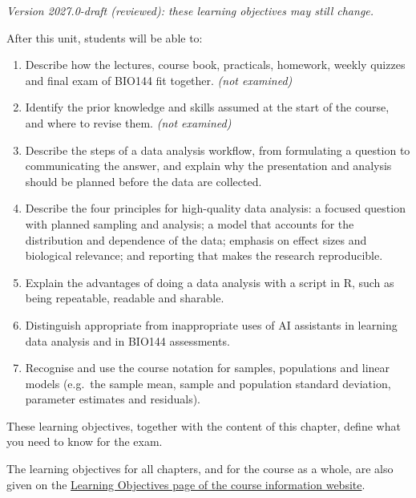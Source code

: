 \documentclass[
  letterpaper,
  8pt,
  a4paper]{book}
\providecommand{\tightlist}{%
  \setlength{\itemsep}{0pt}\setlength{\parskip}{0pt}}
\begin{document}
\begin{tcolorbox}[enhanced jigsaw, arc=.35mm, bottomrule=.15mm, bottomtitle=1mm, breakable, colback=white, colbacktitle=quarto-callout-note-color!10!white, colframe=quarto-callout-note-color-frame, coltitle=black, left=2mm, leftrule=.75mm, opacityback=0, opacitybacktitle=0.6, rightrule=.15mm, title=\textcolor{quarto-callout-note-color}{\faInfo}\hspace{0.5em}{Learning objectives}, titlerule=0mm, toprule=.15mm, toptitle=1mm]

\emph{Version 2027.0-draft (reviewed): these learning objectives may
still change.}

After this unit, students will be able to:

\begin{enumerate}
\def\labelenumi{\arabic{enumi}.}
\tightlist
\item
  Describe how the lectures, course book, practicals, homework, weekly
  quizzes and final exam of BIO144 fit together. \emph{(not examined)}
\item
  Identify the prior knowledge and skills assumed at the start of the
  course, and where to revise them. \emph{(not examined)}
\item
  Describe the steps of a data analysis workflow, from formulating a
  question to communicating the answer, and explain why the presentation
  and analysis should be planned before the data are collected.
\item
  Describe the four principles for high-quality data analysis: a focused
  question with planned sampling and analysis; a model that accounts for
  the distribution and dependence of the data; emphasis on effect sizes
  and biological relevance; and reporting that makes the research
  reproducible.
\item
  Explain the advantages of doing a data analysis with a script in R,
  such as being repeatable, readable and sharable.
\item
  Distinguish appropriate from inappropriate uses of AI assistants in
  learning data analysis and in BIO144 assessments.
\item
  Recognise and use the course notation for samples, populations and
  linear models (e.g.~the sample mean, sample and population standard
  deviation, parameter estimates and residuals).
\end{enumerate}

These learning objectives, together with the content of this chapter,
define what you need to know for the exam.

The learning objectives for all chapters, and for the course as a whole,
are also given on the
\href{https://opetchey.github.io/BIO144_Course_Information/3.1-learning-objectives.html}{Learning
Objectives page of the course information website}.

\end{tcolorbox}
\end{document}
